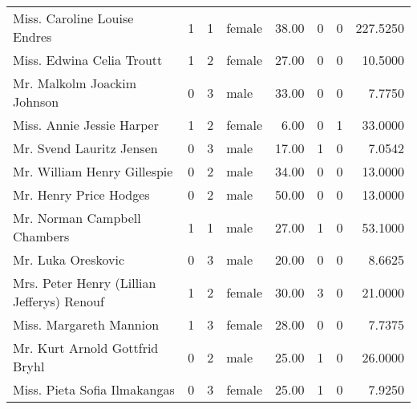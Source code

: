 \begin{tabular}{lrrlrrrr}
Miss. Caroline Louise Endres                       &         1 &       1 &  female &  38.00 &                        0 &                        0 &  227.5250 \\
Miss. Edwina Celia Troutt                          &         1 &       2 &  female &  27.00 &                        0 &                        0 &   10.5000 \\
Mr. Malkolm Joackim Johnson                        &         0 &       3 &    male &  33.00 &                        0 &                        0 &    7.7750 \\
Miss. Annie Jessie Harper                          &         1 &       2 &  female &   6.00 &                        0 &                        1 &   33.0000 \\
Mr. Svend Lauritz Jensen                           &         0 &       3 &    male &  17.00 &                        1 &                        0 &    7.0542 \\
Mr. William Henry Gillespie                        &         0 &       2 &    male &  34.00 &                        0 &                        0 &   13.0000 \\
Mr. Henry Price Hodges                             &         0 &       2 &    male &  50.00 &                        0 &                        0 &   13.0000 \\
Mr. Norman Campbell Chambers                       &         1 &       1 &    male &  27.00 &                        1 &                        0 &   53.1000 \\
Mr. Luka Oreskovic                                 &         0 &       3 &    male &  20.00 &                        0 &                        0 &    8.6625 \\
Mrs. Peter Henry (Lillian Jefferys) Renouf         &         1 &       2 &  female &  30.00 &                        3 &                        0 &   21.0000 \\
Miss. Margareth Mannion                            &         1 &       3 &  female &  28.00 &                        0 &                        0 &    7.7375 \\
Mr. Kurt Arnold Gottfrid Bryhl                     &         0 &       2 &    male &  25.00 &                        1 &                        0 &   26.0000 \\
Miss. Pieta Sofia Ilmakangas                       &         0 &       3 &  female &  25.00 &                        1 &                        0 &    7.9250 \\

\end{tabular}
